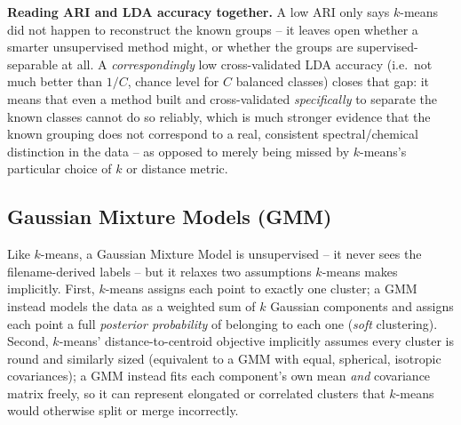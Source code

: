 \documentclass[11pt,a4paper]{article}
\begin{document}
\begin{tbnote}
\textbf{Reading ARI and LDA accuracy together.} A low ARI only says
$k$-means did not happen to reconstruct the known groups -- it leaves open
whether a smarter unsupervised method might, or whether the groups are
supervised-separable at all. A \emph{correspondingly} low cross-validated
LDA accuracy (i.e.\ not much better than $1/C$, chance level for $C$
balanced classes) closes that gap: it means that even a method built and
cross-validated \emph{specifically} to separate the known classes cannot do
so reliably, which is much stronger evidence that the known grouping does
not correspond to a real, consistent spectral/chemical distinction in the
data -- as opposed to merely being missed by $k$-means's particular choice
of $k$ or distance metric.
\end{tbnote}

\subsection{Gaussian Mixture Models (GMM)}
\label{sec:gmm}
Like $k$-means, a Gaussian Mixture Model is unsupervised -- it never sees
the filename-derived labels -- but it relaxes two assumptions $k$-means
makes implicitly. First, $k$-means assigns each point to exactly one
cluster; a GMM instead models the data as a weighted sum of $k$ Gaussian
components and assigns each point a full \emph{posterior probability} of
belonging to each one (\emph{soft} clustering). Second, $k$-means'
distance-to-centroid objective implicitly assumes every cluster is round
and similarly sized (equivalent to a GMM with equal, spherical, isotropic
covariances); a GMM instead fits each component's own mean
\emph{and} covariance matrix freely, so it can represent elongated or
correlated clusters that $k$-means would otherwise split or merge
incorrectly.
\end{document}
